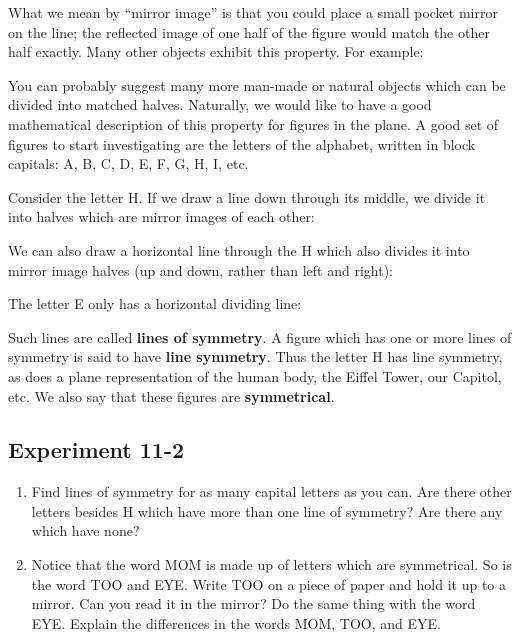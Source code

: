 \documentclass[12pt]{book} %
\begin{document}
\begin{ExerciseList}

What we mean by ``mirror image'' is that you could place a small pocket mirror on the line; the reflected image of one half of the figure would match the other half exactly. Many other objects exhibit this property. For example:


You can probably suggest many more man-made or natural objects which can be divided into matched halves. Naturally, we would like to have a good mathematical description of this property for figures in the plane. A good set of figures to start investigating are the letters of the alphabet, written in block capitals: A, B, C, D, E, F, G, H, I, etc.

Consider the letter H. If we draw a line down through its middle, we divide it into halves which are mirror images of each other:


We can also draw a horizontal line through the H which also divides it into mirror image halves (up and down, rather than left and right):


The letter E only has a horizontal dividing line:


Such lines are called \textbf{lines of symmetry}. A figure which has one or more lines of symmetry is said to have \textbf{line symmetry}. Thus the letter H has line symmetry, as does a plane representation of the human body, the Eiffel Tower, our Capitol, etc. We also say that these figures are \textbf{symmetrical}.

\subsection*{Experiment 11-2}

\begin{enumerate}
\item Find lines of symmetry for as many capital letters as you can. Are there other letters besides H which have more than one line of symmetry? Are there any which have none?

\item Notice that the word MOM is made up of letters which are symmetrical. So is the word TOO and EYE. Write TOO on a piece of paper and hold it up to a mirror. Can you read it in the mirror? Do the same thing with the word EYE. Explain the differences in the words MOM, TOO, and EYE.


\end{enumerate}
\end{ExerciseList}
\end{document}
